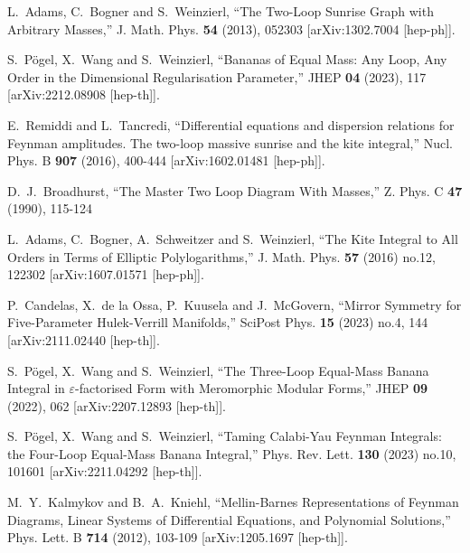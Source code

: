 \documentclass[a4paper,12pt]{article}
\numberwithin{equation}{section}
\numberwithin{figure}{section}
\begin{document}
\begin{thebibliography}{99}
L.~Adams, C.~Bogner and S.~Weinzierl,
``The Two-Loop Sunrise Graph with Arbitrary Masses,''
J. Math. Phys. \textbf{54} (2013), 052303
[arXiv:1302.7004 [hep-ph]].

S.~P\"ogel, X.~Wang and S.~Weinzierl,
``Bananas of Equal Mass: Any Loop, Any Order in the Dimensional Regularisation Parameter,''
JHEP \textbf{04} (2023), 117
[arXiv:2212.08908 [hep-th]].

 

E.~Remiddi and L.~Tancredi,
``Differential equations and dispersion relations for Feynman amplitudes. The two-loop massive sunrise and the kite integral,''
Nucl. Phys. B \textbf{907} (2016), 400-444
[arXiv:1602.01481 [hep-ph]].


D.~J.~Broadhurst,
``The Master Two Loop Diagram With Masses,''
Z. Phys. C \textbf{47} (1990), 115-124
  
L.~Adams, C.~Bogner, A.~Schweitzer and S.~Weinzierl,
``The Kite Integral to All Orders in Terms of Elliptic Polylogarithms,''
J. Math. Phys. \textbf{57} (2016) no.12, 122302
[arXiv:1607.01571 [hep-ph]].

P.~Candelas, X.~de la Ossa, P.~Kuusela and J.~McGovern,
``Mirror Symmetry for Five-Parameter Hulek-Verrill Manifolds,''
SciPost Phys. \textbf{15} (2023) no.4, 144
[arXiv:2111.02440 [hep-th]].


S.~P\"ogel, X.~Wang and S.~Weinzierl,
``The Three-Loop Equal-Mass Banana Integral in \ensuremath{\varepsilon}-factorised Form with Meromorphic Modular Forms,''
JHEP \textbf{09} (2022), 062
[arXiv:2207.12893 [hep-th]].


S.~P\"ogel, X.~Wang and S.~Weinzierl,
``Taming Calabi-Yau Feynman Integrals: the Four-Loop Equal-Mass Banana Integral,''
Phys. Rev. Lett. \textbf{130} (2023) no.10, 101601
[arXiv:2211.04292 [hep-th]].


M.~Y.~Kalmykov and B.~A.~Kniehl,
``Mellin-Barnes Representations of Feynman Diagrams, Linear Systems of Differential Equations, and Polynomial Solutions,''
Phys. Lett. B \textbf{714} (2012), 103-109
[arXiv:1205.1697 [hep-th]].



\end{thebibliography}
\end{document}
